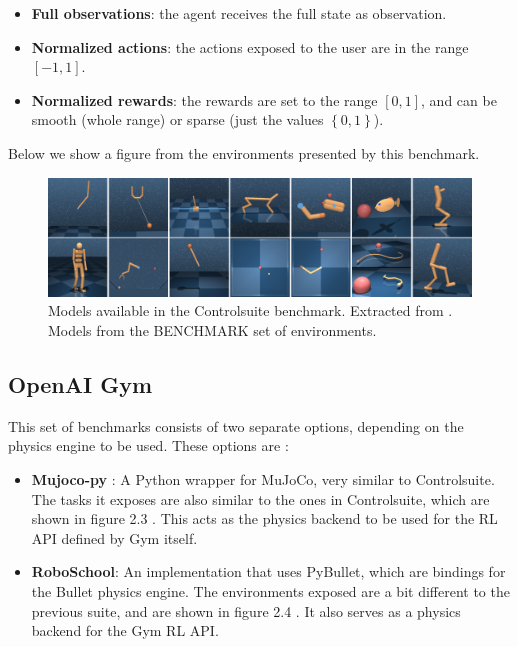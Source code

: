     \begin{itemize}
        \item \textbf{Full observations}: the agent receives the full state as observation.
        \item \textbf{Normalized actions}: the actions exposed to the user are in the range $\left[-1,1\right]$.
        \item \textbf{Normalized rewards}: the rewards are set to the range $\left[ 0, 1 \right]$, and can be smooth (whole range)
                or sparse (just the values $\left\{0,1\right\}$).
    \end{itemize}

    Below we show a figure from the environments presented by this benchmark.

    \begin{figure}[!ht]
        \centering
        \includegraphics[width=5.5in]{./chapters/imgs/img_controlsuite_envs.png}
        \caption[Controlsuite models]{Models available in the Controlsuite benchmark. Extracted from \citet{Controlsuite}.
                                      Models from the BENCHMARK set of environments.}
        \label{fig:controlsuite-envs}
    \end{figure}

    \subsection{OpenAI Gym}
    This set of benchmarks consists of two separate options, depending on the physics engine to be used. These options are :

    \begin{itemize}
        \item \textbf{Mujoco-py} : A Python wrapper for MuJoCo, very similar to Controlsuite. The tasks it
            exposes are also similar to the ones in Controlsuite, which are shown in figure 2.3 . This acts as
            the physics backend to be used for the RL API defined by Gym itself.
        \item \textbf{RoboSchool}: An implementation that uses PyBullet, which are bindings for the Bullet physics
            engine. The environments exposed are a bit different to the previous suite, and are shown in figure 2.4 . It
            also serves as a physics backend for the Gym RL API.
    \end{itemize}

